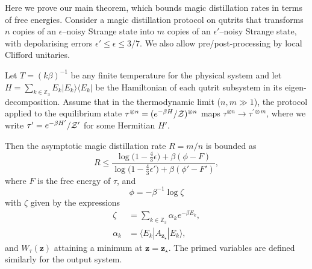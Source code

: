 \documentclass[
twocolumn,
superscriptaddress
]{revtex4-1}
\newenvironment{customthm}[1]
  {\renewcommand\theinnercustomthm{#1}\innercustomthm}
  {\endinnercustomthm}
\def\>{\rangle}
\def\<{\langle}
\def\z{\boldsymbol{z}}
\def\Z{{\cal Z}}
\begin{document}
Here we prove our main theorem, which bounds magic distillation rates in terms of free energies.
\begin{customthm}{7}\label{thm:free-energy}
	Consider a magic distillation protocol on qutrits that transforms $n$ copies of an $\epsilon$--noisy Strange state into $m$ copies of an $\epsilon'$--noisy Strange state, with depolarising errors $\epsilon' \leq \epsilon \leq 3/7$. We also allow pre/post-processing by local Clifford unitaries.
	
	Let $T =(k\beta)^{-1}$ be any finite temperature for the physical system and let $H= \sum_{k \in \mathbb{Z}_3} E_k |E_k\>\<E_k|$ be the Hamiltonian of each qutrit subsystem in its eigen-decomposition.
Assume that in the thermodynamic limit ($n,m \gg 1$), the protocol applied to the equilibrium state $\tau^{\otimes n} = (e^{-\beta H}/\Z)^{\otimes n}$ maps $\tau^{\otimes n} \longrightarrow \tau^{\prime \otimes m}$, where we write $\tau' = e^{-\beta H'}/\Z'$ for some Hermitian $H'$.

Then the asymptotic magic distillation rate $R = m/n$ is bounded as
\begin{equation}\label{eq:rate_bounds_proof}
	R \leq \dfrac{\log \big( 1-\frac{4}{3}\epsilon \big) + \beta (\phi - F)}{\log \big( 1-\frac{4}{3}\epsilon' \big) + \beta (\phi' - F')},
\end{equation}
where $F$ is the free energy of $\tau$,  and 
\begin{equation}\label{eq:phi}
	\phi = -\beta^{-1} \log \zeta
\end{equation}
with $\zeta$ given by the expressions
\begin{align}
	\zeta &= \sum_{k\in \mathbb{Z}_3} \alpha_k e^{-\beta E_k}, \\
	\alpha_k &= \<E_k| A_{\z_\star} |E_k\>,
\end{align}
and $W_\tau(\z)$ attaining a minimum at $\z=\z_\star$. The primed variables are defined similarly for the output system.
\end{customthm}
\end{document}
